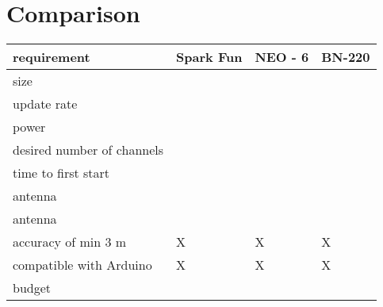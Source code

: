 \documentclass{article}[10pt]
\begin{document}
\section{Comparison}
\begin{center}
    \begin{tabularx}{0.8\textwidth}{
    | >{\centering\arraybackslash}X 
    | >{\centering\arraybackslash}X 
    | >{\centering\arraybackslash}X  
    | >{\centering\arraybackslash}X | }

    \hline
    requirement&Spark Fun&NEO - 6&BN-220 \\
    \hline
    size&&&\\
    \hline
    update rate&&&\\
    \hline
    power&&&\\
    \hline
    desired number of channels&&&\\
    \hline
    time to first start&&&\\
    \hline
    antenna&&&\\
    \hline
    antenna&&&\\
    \hline
    accuracy of min 3 m&X&X&X\\
    \hline
    compatible with Arduino&X&X&X\\
    \hline
    budget&&&\\
    \hline
\end{tabularx}
\end{center}

   
   
\end{document}
